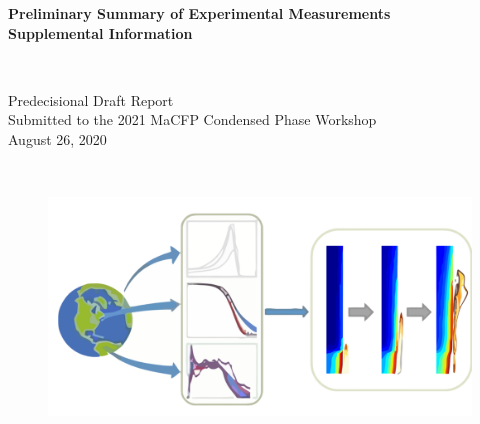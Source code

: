 \documentclass{book}
\begin{document}

\thispagestyle{empty}


\vspace*{0.75in}

\begin{center}
\begin{Large}
{\bf Preliminary Summary of Experimental Measurements} \\
{\bf Supplemental Information} \\
\end{Large}
\hspace{1in} \\
\end{center}

\begin{center}
\begin{large}
Predecisional Draft Report\\
Submitted to the 2021 MaCFP Condensed Phase Workshop \\
August 26, 2020 \\
\end{large}
\hspace{2in} \\
\end{center}

\begin{figure}[h]
  \centering
  \includegraphics[width=6in]{FIGURES/MaCFP_Logo}
  \label{Cover_Image}
\end{figure}

\vfill
\end{document}
